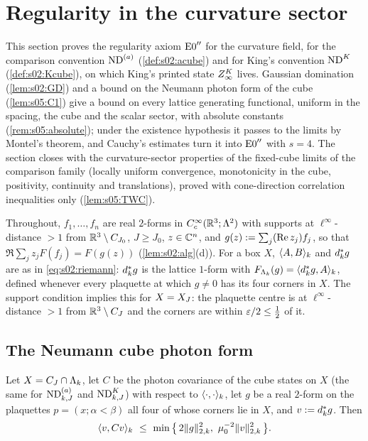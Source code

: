 \section{Regularity in the curvature sector}

This section proves the regularity axiom $\mathrm{E0}''$ for the curvature field, for the comparison convention $\mathrm{ND}^{(a)}$ (\cref{def:s02:acube}) and for King's convention $\mathrm{ND}^{K}$ (\cref{def:s02:Kcube}), on which King's printed state $Z^{K}_{\infty}$ lives. Gaussian domination (\cref{lem:s02:GD}) and a bound on the Neumann photon form of the cube (\cref{lem:s05:C1}) give a bound on every lattice generating functional, uniform in the spacing, the cube and the scalar sector, with absolute constants (\cref{rem:s05:absolute}); under the existence hypothesis it passes to the limits by Montel's theorem, and Cauchy's estimates turn it into $\mathrm{E0}''$ with $s=4$. The section closes with the curvature-sector properties of the fixed-cube limits of the comparison family (locally uniform convergence, monotonicity in the cube, positivity, continuity and translations), proved with cone-direction correlation inequalities only (\cref{lem:s05:TWC}).

Throughout, $f_1,\dots,f_n$ are real $2$-forms in $C^\infty_c(\mathbb R^3;\Lambda^2)$ with supports at $\ell^\infty$-distance $>1$ from $\mathbb R^3\setminus C_{J_0}$, $J\ge J_0$, $z\in\mathbb C^n$, and $g(z):=\sum_j(\operatorname{Re} z_j)f_j$, so that $\Re\sum_jz_jF(f_j)=F(g(z))$ (\cref{lem:s02:alg}(d)). For a box $X$, $\langle A,B\rangle_k$ and $d^{*}_kg$ are as in \eqref{eq:s02:riemann}: $d^{*}_kg$ is the lattice $1$-form with $F_{\Lambda_k}(g)=\langle d^{*}_kg,A\rangle_k$, defined whenever every plaquette at which $g\ne0$ has its four corners in $X$. The support condition implies this for $X=X_J$: the plaquette centre is at $\ell^\infty$-distance $>1$ from $\mathbb R^3\setminus C_J$ and the corners are within $\varepsilon/2\le\frac12$ of it.

\subsection{The Neumann cube photon form}

\begin{lemma}\label{lem:s05:C1}
Let $X=C_J\cap\Lambda_k$, let $C$ be the photon covariance of the cube states on $X$ (the same for $\mathrm{ND}^{(a)}_{k,J}$ and $\mathrm{ND}^{K}_{k,J}$) with respect to $\langle \cdot,\cdot\rangle_k$, let $g$ be a real $2$-form on the plaquettes $p=(x;\alpha<\beta)$ all four of whose corners lie in $X$, and $v:=d^{*}_kg$. Then
\[
\ip v{Cv}_k\ \le\ \min\big\{\,2\norm{g}_{2,k}^2,\ \lmu^{-2}\norm{v}_{2,k}^2\,\big\}.
\]
\end{lemma}

